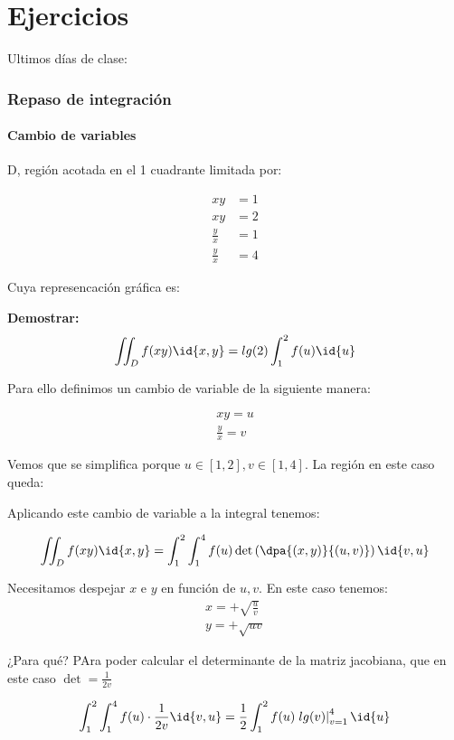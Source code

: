 

\chapter{Ejercicios}
Ultimos días de clase:
\subsection{Repaso de integración}
\subsubsection{Cambio de variables}

D, región acotada en el 1 cuadrante limitada por:

\[\begin{array}{cc}
xy&=1\\xy&=2\\\frac{y}{x} &=1\\\frac{y}{x}&=4
\end{array}\]

Cuya represencación gráfica es:


\textbf{Demostrar:}\[\iint_D f(xy)\id{x,y} = lg(2)\int_1^2f(u)\id{u}\]

Para ello definimos un cambio de variable de la siguiente manera:

\begin{gather*}
xy=u\\
\frac{y}{x}=v
\end{gather*}

Vemos que se simplifica porque $u\in[1,2],v\in[1,4]$. La región en este caso queda:


Aplicando este cambio de variable a la integral tenemos:

\[\iint_D f(xy)\id{x,y} = \int_1^2\int_1^4 f(u) \det \left(\dpa{(x,y)}{(u,v)}\right)\id{v,u}\]

Necesitamos despejar $x$ e $y$ en función de $u,v$. En este caso tenemos: 
\begin{gather*}
x=+\sqrt{\frac{u}{v}}\\ y= + \sqrt{uv}
\end{gather*}

¿Para qué? PAra poder calcular el determinante de la matriz jacobiana, que en este caso $\displaystyle\det = \frac{1}{2v}$

\[\int_1^2\int_1^4 f(u)\cdot  \frac{1}{2v}\id{v,u} = \frac{1}{2} \int_1^2 f(u) \left.lg(v)\right|_{v=1}^4 \id{u}\]

